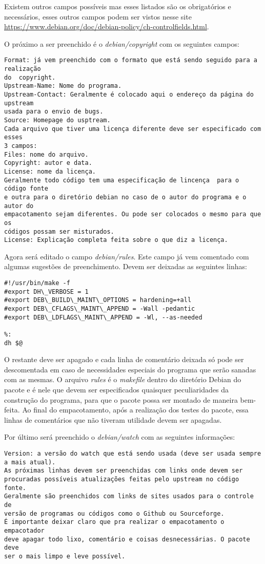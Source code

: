 Existem outros campos possíveis mas esses listados são os obrigatórios e necessários, esses outros campos podem ser vistos nesse site \url{https://www.debian.org/doc/debian-policy/ch-controlfields.html}.

O próximo a ser preenchido é o \textit{debian/copyright} com os seguintes campos:
\begin{verbatim}
Format: já vem preenchido com o formato que está sendo seguido para a realização
do  copyright.
Upstream-Name: Nome do programa.
Upstream-Contact: Geralmente é colocado aqui o endereço da página do upstream
usada para o envio de bugs.
Source: Homepage do usptream.
Cada arquivo que tiver uma licença diferente deve ser especificado com esses
3 campos:
Files: nome do arquivo.
Copyright: autor e data.
License: nome da licença.
Geralmente todo código tem uma especificação de lincença  para o código fonte
e outra para o diretório debian no caso de o autor do programa e o autor do
empacotamento sejam diferentes. Ou pode ser colocados o mesmo para que os 
códigos possam ser misturados.
License: Explicação completa feita sobre o que diz a licença. 
\end{verbatim}

Agora será editado o campo \textit{debian/rules}. Este campo já vem comentado com algumas sugestões de preenchimento. Devem ser deixadas as seguintes linhas:
\begin{verbatim}
#!/usr/bin/make -f
#export DH\_VERBOSE = 1
#export DEB\_BUILD\_MAINT\_OPTIONS = hardening=+all
#export DEB\_CFLAGS\_MAINT\_APPEND = -Wall -pedantic
#export DEB\_LDFLAGS\_MAINT\_APPEND = -Wl, --as-needed

%:
dh $@

\end{verbatim}
O restante deve ser apagado e cada linha de comentário deixada só pode ser descomentada em caso de necessidades especiais do programa que serão sanadas com as mesmas. O arquivo \textit{rules} é o \textit{makefile} dentro do diretório Debian do pacote e é nele que devem ser especificados quaisquer peculiaridades da construção do programa, para que o pacote possa ser montado de maneira bem-feita. Ao final do empacotamento, após a realização dos testes do pacote, essa linhas de comentários que não tiveram utilidade devem ser apagadas.

Por último será preenchido o \textit{debian/watch} com as seguintes informações:
\begin{verbatim}
Version: a versão do watch que está sendo usada (deve ser usada sempre
a mais atual).
As próximas linhas devem ser preenchidas com links onde devem ser 
procuradas possíveis atualizações feitas pelo upstream no código fonte.
Geralmente são preenchidos com links de sites usados para o controle de 
versão de programas ou códigos como o Github ou Sourceforge.
É importante deixar claro que pra realizar o empacotamento o empacotador
deve apagar todo lixo, comentário e coisas desnecessárias. O pacote deve
ser o mais limpo e leve possível.
\end{verbatim}

